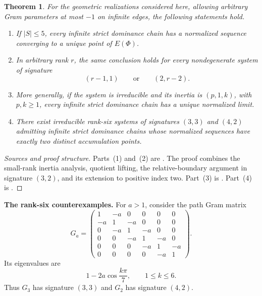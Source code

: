 \documentclass[11pt,reqno]{amsart}
\theoremstyle{plain}
\newtheorem{theorem}{Theorem}[section]
\theoremstyle{definition}
\theoremstyle{remark}
\numberwithin{equation}{section}
\begin{document}
\begin{theorem}\label{thm:main}
For the geometric realizations considered here, allowing arbitrary
Gram parameters at most $-1$ on infinite edges, the following
statements hold.
\begin{enumerate}
    \item If $|S|\le5$, every infinite strict dominance chain
    has a normalized sequence converging to a unique point
    of $E(\Phi)$.

    \item In arbitrary rank $r$, the same conclusion holds
    for every nondegenerate system of signature
    \[
    (r-1,1)
    \qquad\text{or}\qquad
    (2,r-2).
    \]

    \item More generally, if the system is irreducible and
    its inertia is $(p,1,k)$, with $p,k\ge1$, every infinite
    strict dominance chain has a unique normalized limit.

    \item There exist irreducible rank-six systems of
    signatures $(3,3)$ and $(4,2)$ admitting infinite strict
    dominance chains whose normalized sequences have exactly
    two distinct accumulation points.
\end{enumerate}
\end{theorem}

\begin{proof}[Sources and proof structure]
Parts~(1) and~(2) are
\cite[Theorem~2.1]{WangUniqueness}.
The proof combines the small-rank inertia analysis, quotient
lifting, the relative-boundary argument in signature $(3,2)$,
and its extension to positive index two.
Part~(3) is
\cite[Corollary~2.18]{WangUniqueness}.
Part~(4) is
\cite[Proposition~4.10 and Remark~4.11]{WangUniqueness}.
\end{proof}

\par\medskip
\noindent\textbf{The rank-six counterexamples.}
For $a>1$, consider the path Gram matrix
\[
G_a=
\begin{pmatrix}
1&-a&0&0&0&0\\
-a&1&-a&0&0&0\\
0&-a&1&-a&0&0\\
0&0&-a&1&-a&0\\
0&0&0&-a&1&-a\\
0&0&0&0&-a&1
\end{pmatrix}.
\]
Its eigenvalues are
\[
1-2a\cos\frac{k\pi}{7},
\qquad 1\le k\le6.
\]
Thus $G_3$ has signature $(3,3)$ and $G_2$ has signature $(4,2)$.
\end{document}
